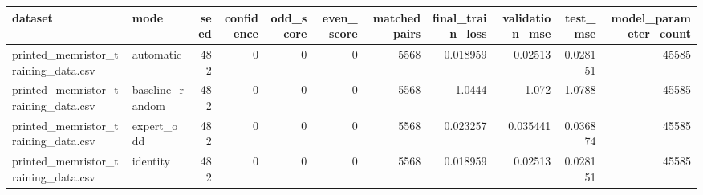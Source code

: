\begin{tabular}{llrrrrrrrrr}
\toprule
dataset & mode & seed & confidence & odd\_score & even\_score & matched\_pairs & final\_train\_loss & validation\_mse & test\_mse & model\_parameter\_count \\
\midrule
printed\_memristor\_training\_data.csv & automatic & 482 & 0 & 0 & 0 & 5568 & 0.018959 & 0.02513 & 0.028151 & 45585 \\
printed\_memristor\_training\_data.csv & baseline\_random & 482 & 0 & 0 & 0 & 5568 & 1.0444 & 1.072 & 1.0788 & 45585 \\
printed\_memristor\_training\_data.csv & expert\_odd & 482 & 0 & 0 & 0 & 5568 & 0.023257 & 0.035441 & 0.036874 & 45585 \\
printed\_memristor\_training\_data.csv & identity & 482 & 0 & 0 & 0 & 5568 & 0.018959 & 0.02513 & 0.028151 & 45585 \\
\bottomrule
\end{tabular}

